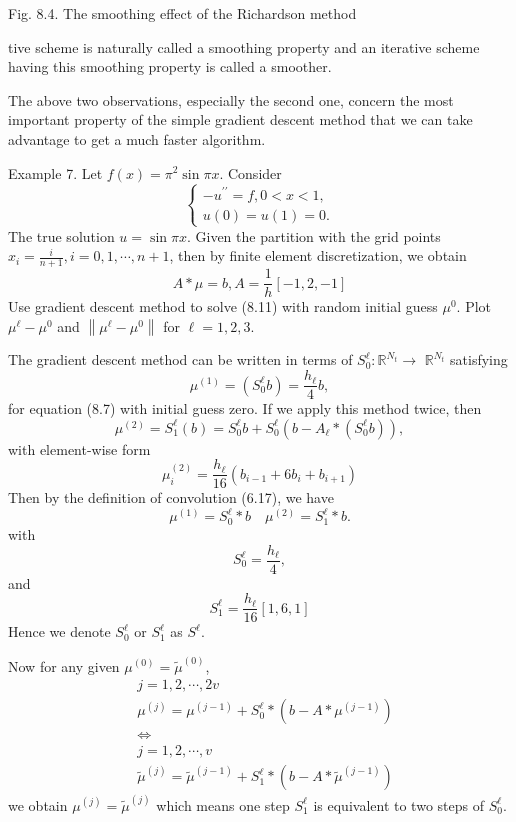 \documentclass[10pt]{article}
\begin{document}
Fig. 8.4. The smoothing effect of the Richardson method

tive scheme is naturally called a smoothing property and an iterative scheme having this smoothing property is called a smoother.

The above two observations, especially the second one, concern the most important property of the simple gradient descent method that we can take advantage to get a much faster algorithm.

Example 7. Let $f(x)=\pi^{2} \sin \pi x$. Consider
$$
\left\{\begin{array}{l}
-u^{\prime \prime}=f, 0<x<1, \\
u(0)=u(1)=0 .
\end{array}\right.
$$
The true solution $u=\sin \pi x$. Given the partition with the grid points $x_{i}=\frac{i}{n+1}, i=0,1, \cdots, n+1$, then by finite element discretization, we obtain
$$
A * \mu=b, A=\frac{1}{h}[-1,2,-1]
$$
Use gradient descent method to solve (8.11) with random initial guess $\mu^{0}$. Plot $\mu^{\ell}-\mu^{0}$ and $\left\|\mu^{\ell}-\mu^{0}\right\|$ for $\ell=1,2,3$.

The gradient descent method can be written in terms of $S_{0}^{\ell}: \mathbb{R}^{N_{t}} \rightarrow$ $\mathbb{R}^{N_{t}}$ satisfying
$$
\mu^{(1)}=\left(S_{0}^{\ell} b\right)=\frac{h_{\ell}}{4} b,
$$
for equation (8.7) with initial guess zero. If we apply this method twice, then
$$
\mu^{(2)}=S_{1}^{\ell}(b)=S_{0}^{\ell} b+S_{0}^{\ell}\left(b-A_{\ell} *\left(S_{0}^{\ell} b\right)\right),
$$
with element-wise form
$$
\mu_{i}^{(2)}=\frac{h_{\ell}}{16}\left(b_{i-1}+6 b_{i}+b_{i+1}\right)
$$
Then by the definition of convolution (6.17), we have
$$
\mu^{(1)}=S_{0}^{\ell} * b \quad \mu^{(2)}=S_{1}^{\ell} * b .
$$
with
$$
S_{0}^{\ell}=\frac{h_{\ell}}{4},
$$
and
$$
S_{1}^{\ell}=\frac{h_{\ell}}{16}[1,6,1]
$$
Hence we denote $S_{0}^{\ell}$ or $S_{1}^{\ell}$ as $S^{\ell}$.

Now for any given $\mu^{(0)}=\tilde{\mu}^{(0)}$,
$$
\begin{aligned}
&j=1,2, \cdots, 2 v \\
&\mu^{(j)}=\mu^{(j-1)}+S_{0}^{\ell} *\left(b-A * \mu^{(j-1)}\right) \\
&\Leftrightarrow \\
&j=1,2, \cdots, v \\
&\tilde{\mu}^{(j)}=\tilde{\mu}^{(j-1)}+S_{1}^{\ell} *\left(b-A * \tilde{\mu}^{(j-1)}\right)
\end{aligned}
$$
we obtain $\mu^{(j)}=\tilde{\mu}^{(j)}$ which means one step $S_{1}^{\ell}$ is equivalent to two steps of $S_{0}^{\ell}$.
\end{document}
